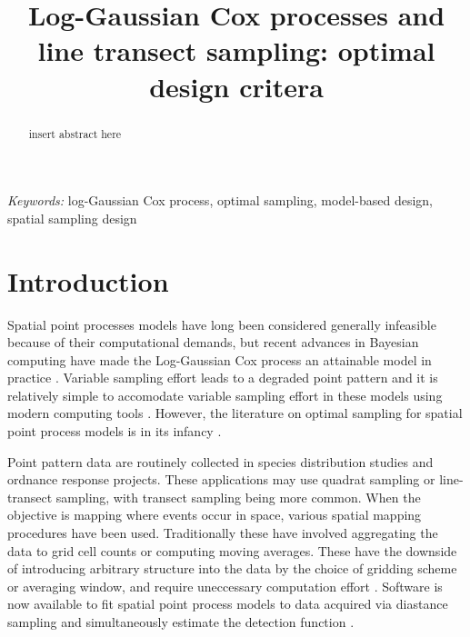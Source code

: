 \documentclass[12pt]{article}
\begin{document}
\title{\bf Log-Gaussian Cox processes and line transect sampling: optimal design critera}

\author{}
\date{}        
\maketitle

\bigskip
\begin{abstract}

\noindent insert abstract here

\end{abstract}

{\it Keywords:} log-Gaussian Cox process, optimal sampling, model-based design, spatial sampling design

\linenumbers


\section{Introduction}

Spatial point processes models have long been considered generally infeasible
because of their computational demands, but recent advances in Bayesian
computing have made the Log-Gaussian Cox process an attainable model in
practice \citep{rueetal, lindgrenetal, illianetal, simpsonetal}. Variable
sampling effort leads to a degraded point pattern \cite{chakrabortyetal} and
it is relatively simple to accomodate variable sampling effort in these models
using modern computing tools \citep{yuanetal}. However, the literature on
optimal sampling for spatial point process models is in its infancy
\citep{liuvanhatalo}.

Point pattern data are routinely collected in species distribution studies and
ordnance response projects. These applications may use quadrat sampling or
line-transect sampling, with transect sampling being more common. When the
objective is mapping where events occur in space, various spatial mapping
procedures have been used. Traditionally these have involved aggregating the
data to grid cell counts or computing moving averages. These have the downside
of introducing arbitrary structure into the data by the choice of gridding
scheme or averaging window, and require uneccessary computation effort
\citep{simpsonetal}. Software is now available to fit spatial point process
models to data acquired via diastance sampling and simultaneously estimate the
detection function \citep{dspat}.
\end{document}
